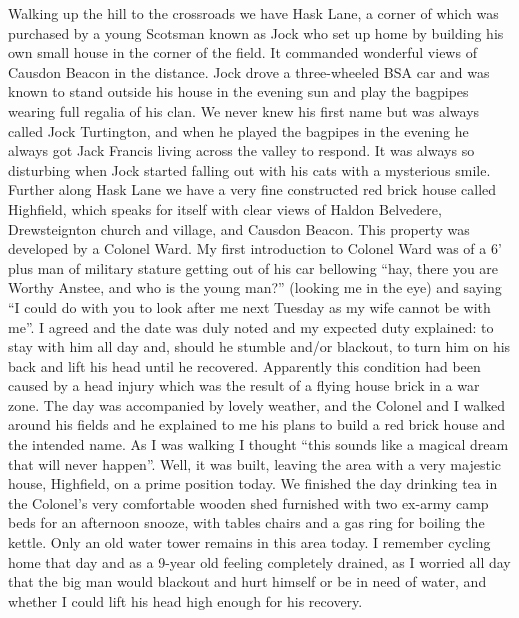 
Walking up the hill to the crossroads we have Hask Lane, a corner of which was
purchased by a young Scotsman known as Jock who set up home by building his own
small house in the corner of the field. It commanded wonderful views of Causdon
Beacon in the distance. Jock drove a three-wheeled BSA car and was known to
stand outside his house in the evening sun and play the bagpipes wearing full
regalia of his clan. We never knew his first name but was always called Jock
Turtington, and when he played the bagpipes in the evening he always got Jack
Francis living across the valley to respond. It was always so disturbing when
Jock started falling out with his cats with a mysterious smile. Further along
Hask Lane we have a very fine constructed red brick house called Highfield,
which speaks for itself with clear views of Haldon Belvedere, Drewsteignton
church and village, and Causdon Beacon. This property was developed by a
Colonel Ward. My first introduction to Colonel Ward was of a 6' plus man of
military stature getting out of his car bellowing ``hay, there you are Worthy
Anstee, and who is the young man?'' (looking me in the eye) and saying ``I
could do with you to look after me next Tuesday as my wife cannot be with me''.
I agreed and the date was duly noted and my expected duty explained: to stay
with him all day and, should he stumble and/or blackout, to turn him on his
back and lift his head until he recovered. Apparently this condition had been
caused by a head injury which was the result of a flying house brick in a war
zone. The day was accompanied by lovely weather, and the Colonel and I walked
around his fields and he explained to me his plans to build a red brick house
and the intended name. As I was walking I thought ``this sounds like a magical
dream that will never happen''. Well, it was built, leaving the area with a
very majestic house, Highfield, on a prime position today. We finished the day
drinking tea in the Colonel's very comfortable wooden shed furnished with two
ex-army camp beds for an afternoon snooze, with tables chairs and a gas ring
for boiling the kettle. Only an old water tower remains in this area today. I
remember cycling home that day and as a 9-year old feeling completely drained,
as I worried all day that the big man would blackout and hurt himself or be in
need of water, and whether I could lift his head high enough for his recovery.

